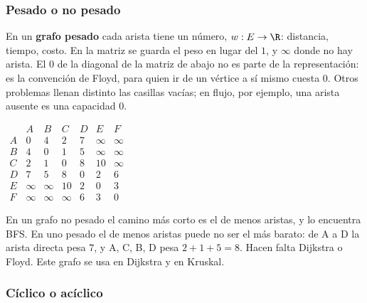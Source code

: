 \documentclass[11pt,letterpaper]{article}
\begin{document}
\subsubsection*{Pesado o no pesado}

En un \textbf{grafo pesado} cada arista tiene un número,
$w : E \to \R$: distancia, tiempo, costo. En la matriz se guarda el
peso en lugar del $1$, y $\infty$ donde no hay arista. El $0$ de la
diagonal de la matriz de abajo no es parte de la representación: es
la convención de Floyd, para quien ir de un vértice a sí mismo cuesta
$0$. Otros problemas llenan distinto las casillas vacías; en flujo,
por ejemplo, una arista ausente es una capacidad $0$.

\begin{center}
\hspace{0.8cm}
$\begin{array}{c|cccccc}
    & A & B & C & D & E & F \\ \hline
  A & 0 & 4 & 2 & 7 & \infty & \infty \\
  B & 4 & 0 & 1 & 5 & \infty & \infty \\
  C & 2 & 1 & 0 & 8 & 10 & \infty \\
  D & 7 & 5 & 8 & 0 & 2 & 6 \\
  E & \infty & \infty & 10 & 2 & 0 & 3 \\
  F & \infty & \infty & \infty & 6 & 3 & 0
\end{array}$
\end{center}

En un grafo no pesado el camino más corto es el de menos aristas, y
lo encuentra BFS. En uno pesado el de menos aristas puede no ser el
más barato: de A a D la arista directa pesa $7$, y A, C, B, D pesa
$2 + 1 + 5 = 8$. Hacen falta Dijkstra o Floyd. Este grafo se usa en
Dijkstra y en Kruskal.

\subsubsection*{Cíclico o acíclico}
\end{document}
